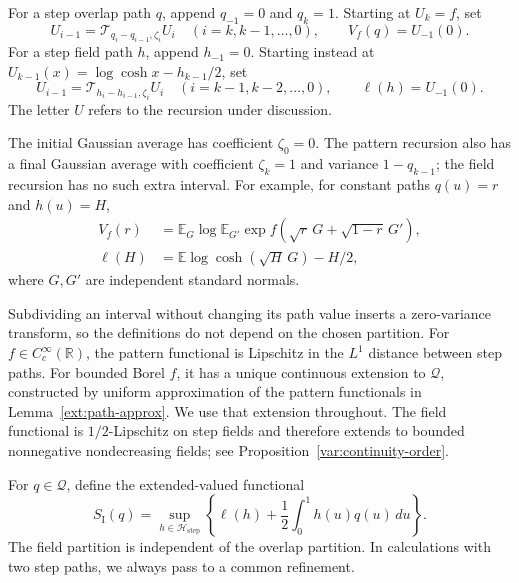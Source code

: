 \begin{definition}\label{def:recursions}
For a step overlap path $q$, append $q_{-1}=0$ and $q_k=1$. Starting at
$U_k=f$, set
\begin{equation}\label{def:pattern-recursion}
 U_{i-1}=\mathcal T_{q_i-q_{i-1},\zeta_i}U_i
 \quad(i=k,k-1,\ldots,0),\qquad V_f(q)=U_{-1}(0).
\end{equation}
For a step field path $h$, append $h_{-1}=0$. Starting instead at
$U_{k-1}(x)=\log\cosh x-h_{k-1}/2$, set
\begin{equation}\label{def:field-recursion}
 U_{i-1}=\mathcal T_{h_i-h_{i-1},\zeta_i}U_i
 \quad(i=k-1,k-2,\ldots,0),\qquad \ell(h)=U_{-1}(0).
\end{equation}
The letter $U$ refers to the recursion under discussion.
\end{definition}

The initial Gaussian average has coefficient $\zeta_0=0$. The pattern
recursion also has a final Gaussian average with coefficient $\zeta_k=1$
and variance $1-q_{k-1}$; the field recursion has no such extra interval.
For example, for constant paths $q(u)=r$ and $h(u)=H$,
\begin{align}
 V_f(r)&=\mathbb E_G\log\mathbb E_{G'}
   \exp f(\sqrt r\,G+\sqrt{1-r}\,G'),\label{def:one-level-pattern}\\
 \ell(H)&=\mathbb E\log\cosh(\sqrt H\,G)-H/2,
 \label{def:one-level-field}
\end{align}
where $G,G'$ are independent standard normals.

Subdividing an interval without changing its path value inserts a
zero-variance transform, so the definitions do not depend on the chosen
partition. For $f\in C_c^\infty(\mathbb R)$, the pattern functional is Lipschitz in the
$L^1$ distance between step paths. For bounded Borel $f$, it has a unique
continuous extension to $\mathcal Q$, constructed by uniform approximation
of the pattern functionals in Lemma~\ref{ext:path-approx}. We use that extension throughout. The field
functional is $1/2$-Lipschitz on step fields and therefore extends to bounded
nonnegative nondecreasing fields; see Proposition~\ref{var:continuity-order}.

\begin{definition}\label{def:entropy}
For $q\in\mathcal Q$, define the extended-valued functional
\begin{equation}\label{def:entropy-formula}
 S_{\mathrm I}(q)=\sup_{h\in\mathcal H_{\mathrm{step}}}
 \left\{\ell(h)+\frac12\int_0^1h(u)q(u)\,du\right\}.
\end{equation}
The field partition is independent of the overlap partition. In calculations
with two step paths, we always pass to a common refinement.
\end{definition}

